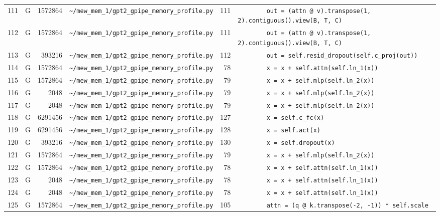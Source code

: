 \documentclass{article}
\begin{document}
\begin{longtable}{r l r p{6.5cm} r p{7.0cm}}
111 & G & 1572864 & \lstinline|~/mew_mem_1/gpt2_gpipe_memory_profile.py| & 111 & \lstinline|        out = (attn @ v).transpose(1, 2).contiguous().view(B, T, C)| \\
112 & G & 1572864 & \lstinline|~/mew_mem_1/gpt2_gpipe_memory_profile.py| & 111 & \lstinline|        out = (attn @ v).transpose(1, 2).contiguous().view(B, T, C)| \\
113 & G & 393216 & \lstinline|~/mew_mem_1/gpt2_gpipe_memory_profile.py| & 112 & \lstinline|        out = self.resid_dropout(self.c_proj(out))| \\
114 & G & 1572864 & \lstinline|~/mew_mem_1/gpt2_gpipe_memory_profile.py| & 78 & \lstinline|        x = x + self.attn(self.ln_1(x))| \\
115 & G & 1572864 & \lstinline|~/mew_mem_1/gpt2_gpipe_memory_profile.py| & 79 & \lstinline|        x = x + self.mlp(self.ln_2(x))| \\
116 & G & 2048 & \lstinline|~/mew_mem_1/gpt2_gpipe_memory_profile.py| & 79 & \lstinline|        x = x + self.mlp(self.ln_2(x))| \\
117 & G & 2048 & \lstinline|~/mew_mem_1/gpt2_gpipe_memory_profile.py| & 79 & \lstinline|        x = x + self.mlp(self.ln_2(x))| \\
118 & G & 6291456 & \lstinline|~/mew_mem_1/gpt2_gpipe_memory_profile.py| & 127 & \lstinline|        x = self.c_fc(x)| \\
119 & G & 6291456 & \lstinline|~/mew_mem_1/gpt2_gpipe_memory_profile.py| & 128 & \lstinline|        x = self.act(x)| \\
120 & G & 393216 & \lstinline|~/mew_mem_1/gpt2_gpipe_memory_profile.py| & 130 & \lstinline|        x = self.dropout(x)| \\
121 & G & 1572864 & \lstinline|~/mew_mem_1/gpt2_gpipe_memory_profile.py| & 79 & \lstinline|        x = x + self.mlp(self.ln_2(x))| \\
122 & G & 1572864 & \lstinline|~/mew_mem_1/gpt2_gpipe_memory_profile.py| & 78 & \lstinline|        x = x + self.attn(self.ln_1(x))| \\
123 & G & 2048 & \lstinline|~/mew_mem_1/gpt2_gpipe_memory_profile.py| & 78 & \lstinline|        x = x + self.attn(self.ln_1(x))| \\
124 & G & 2048 & \lstinline|~/mew_mem_1/gpt2_gpipe_memory_profile.py| & 78 & \lstinline|        x = x + self.attn(self.ln_1(x))| \\
125 & G & 1572864 & \lstinline|~/mew_mem_1/gpt2_gpipe_memory_profile.py| & 105 & \lstinline|        attn = (q @ k.transpose(-2, -1)) * self.scale| \\

\end{longtable}
\end{document}
